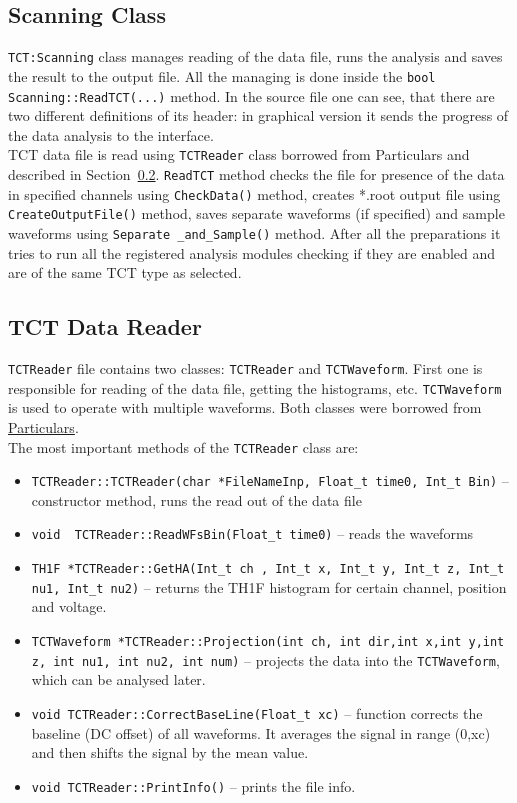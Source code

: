 \documentclass[12pt,oneside,notitlepage,abstracton,a4paper]{scrartcl}
\begin{document}
\subsection{Scanning Class}\label{review:scanning}

\lstinline$TCT:Scanning$ class manages reading of the data file, runs the analysis and saves the result to the output file. All the managing is done inside the \lstinline$bool Scanning::ReadTCT(...)$ method. In the source file one can see, that there are two different definitions of its header: in graphical version it sends the progress of the data analysis to the interface.
\\ \indent TCT data file is read using \lstinline$TCTReader$ class borrowed from Particulars and described in Section~\ref{review:data_reader}. \lstinline$ReadTCT$ method checks the file for presence of the data in specified channels using \lstinline$CheckData()$ method, creates *.root output file using \lstinline$CreateOutputFile()$ method, saves separate waveforms (if specified) and sample waveforms using \lstinline$Separate _and_Sample()$ method. After all the preparations it tries to run all the registered analysis modules checking if they are enabled and are of the same TCT type as selected. 

\subsection{TCT Data Reader}\label{review:data_reader}

\lstinline$TCTReader$ file contains two classes: \lstinline$TCTReader$ and \lstinline$TCTWaveform$. First one is responsible for reading of the data file, getting the histograms, etc. \lstinline$TCTWaveform$ is used to operate with multiple waveforms. Both classes were borrowed from \href{http://particulars.si}{Particulars}.
\\ \indent The most important methods of the \lstinline$TCTReader$ class are:
\begin{itemize}
\item \lstinline$TCTReader::TCTReader(char *FileNameInp, Float_t time0, Int_t Bin)$ -- constructor method, runs the read out of the data file
\item \lstinline$void  TCTReader::ReadWFsBin(Float_t time0)$ -- reads the waveforms
\item \lstinline$TH1F *TCTReader::GetHA(Int_t ch , Int_t x, Int_t y, Int_t z, Int_t nu1, Int_t nu2)$ -- returns the TH1F histogram for certain channel, position and voltage.
\item \lstinline$TCTWaveform *TCTReader::Projection(int ch, int dir,int x,int y,int z, int nu1, int nu2, int num)$ -- projects the data into the \lstinline$TCTWaveform$, which can be analysed later.
\item \lstinline$void TCTReader::CorrectBaseLine(Float_t xc)$ -- function corrects the baseline (DC offset) of all waveforms. It averages the signal in range (0,xc) and then shifts the signal by the mean value.
\item \lstinline$void TCTReader::PrintInfo()$ -- prints the file info.
\end{itemize}
\end{document}
